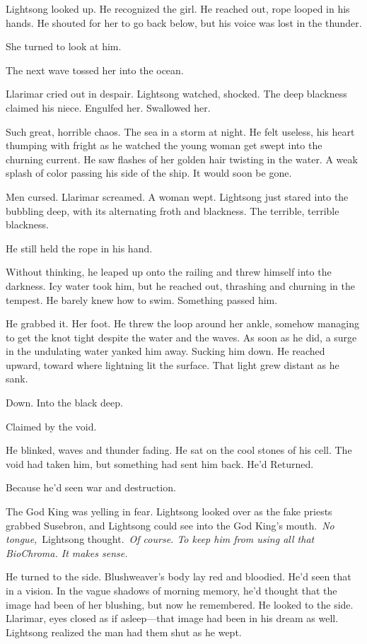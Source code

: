 Lightsong looked up. He recognized the girl. He reached out, rope looped in his hands. He shouted for her to go back below, but his voice was lost in the thunder.

She turned to look at him.

The next wave tossed her into the ocean.

Llarimar cried out in despair. Lightsong watched, shocked. The deep blackness claimed his niece. Engulfed her. Swallowed her.

Such great, horrible chaos. The sea in a storm at night. He felt useless, his heart thumping with fright as he watched the young woman get swept into the churning current. He saw flashes of her golden hair twisting in the water. A weak splash of color passing his side of the ship. It would soon be gone.

Men cursed. Llarimar screamed. A woman wept. Lightsong just stared into the bubbling deep, with its alternating froth and blackness. The terrible, terrible blackness.

He still held the rope in his hand.

Without thinking, he leaped up onto the railing and threw himself into the darkness. Icy water took him, but he reached out, thrashing and churning in the tempest. He barely knew how to swim. Something passed him.

He grabbed it. Her foot. He threw the loop around her ankle, somehow managing to get the knot tight despite the water and the waves. As soon as he did, a surge in the undulating water yanked him away. Sucking him down. He reached upward, toward where lightning lit the surface. That light grew distant as he sank.

Down. Into the black deep.

Claimed by the void.

He blinked, waves and thunder fading. He sat on the cool stones of his cell. The void had taken him, but something had sent him back. He’d Returned.

Because he’d seen war and destruction.

The God King was yelling in fear. Lightsong looked over as the fake priests grabbed Susebron, and Lightsong could see into the God King’s mouth.~\textit{No tongue,}~Lightsong thought.~\textit{Of course. To keep him from using all that BioChroma. It makes sense.}

He turned to the side. Blushweaver’s body lay red and bloodied. He’d seen that in a vision. In the vague shadows of morning memory, he’d thought that the image had been of her blushing, but now he remembered. He looked to the side. Llarimar, eyes closed as if asleep—that image had been in his dream as well. Lightsong realized the man had them shut as he wept.

